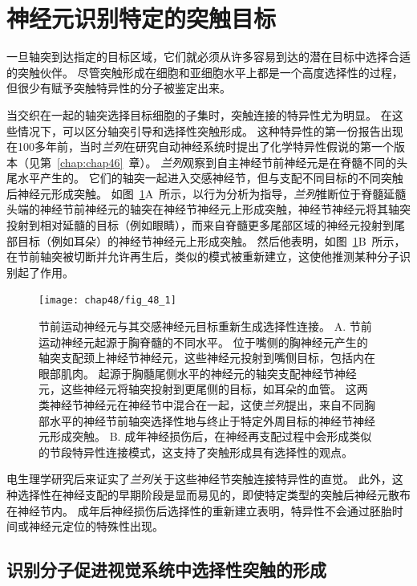 \section{神经元识别特定的突触目标}

一旦轴突到达指定的目标区域，它们就必须从许多容易到达的潜在目标中选择合适的突触伙伴。
尽管突触形成在细胞和亚细胞水平上都是一个高度选择性的过程，但很少有赋予突触特异性的分子被鉴定出来。


当交织在一起的轴突选择目标细胞的子集时，突触连接的特异性尤为明显。
在这些情况下，可以区分轴突引导和选择性突触形成。
这种特异性的第一份报告出现在100多年前，当时\textit{兰列}在研究自动神经系统时提出了化学特异性假说的第一个版本（见第~\ref{chap:chap46}~章）。
\textit{兰列}观察到自主神经节前神经元是在脊髓不同的头尾水平产生的。
它们的轴突一起进入交感神经节，但与支配不同目标的不同突触后神经元形成突触。
如图~\ref{fig:48_1}A~所示，以行为分析为指导，\textit{兰列}推断位于脊髓延髓头端的神经节前神经元的轴突在神经节神经元上形成突触，神经节神经元将其轴突投射到相对延髓的目标（例如眼睛），而来自脊髓更多尾部区域的神经元投射到尾部目标（例如耳朵）的神经节神经元上形成突触。
然后他表明，如图~\ref{fig:48_1}B~所示，在节前轴突被切断并允许再生后，类似的模式被重新建立，这使他推测某种分子识别起了作用。


\begin{figure}[htbp]
	\centering
	\texttt{[image: chap48/fig\_48\_1]}
	\caption{节前运动神经元与其交感神经元目标重新生成选择性连接。
		A. 节前运动神经元起源于胸脊髓的不同水平。
		位于嘴侧的胸神经元产生的轴突支配颈上神经节神经元，这些神经元投射到嘴侧目标，包括内在眼部肌肉。
		起源于胸髓尾侧水平的神经元的轴突支配神经节神经元，这些神经元将轴突投射到更尾侧的目标，如耳朵的血管。
		这两类神经节神经元在神经节中混合在一起，这使\textit{兰列}提出，来自不同胸部水平的神经节前轴突选择性地与终止于特定外周目标的神经节神经元形成突触。
		B. 成年神经损伤后，在神经再支配过程中会形成类似的节段特异性连接模式，这支持了突触形成具有选择性的观点\cite{njaa1977specific}。}
	\label{fig:48_1}
\end{figure}


电生理学研究后来证实了\textit{兰列}关于这些神经节突触连接特异性的直觉。
此外，这种选择性在神经支配的早期阶段是显而易见的，即使特定类型的突触后神经元散布在神经节内。
成年后神经损伤后选择性的重新建立表明，特异性不会通过胚胎时间或神经元定位的特殊性出现。



\subsection{识别分子促进视觉系统中选择性突触的形成}

